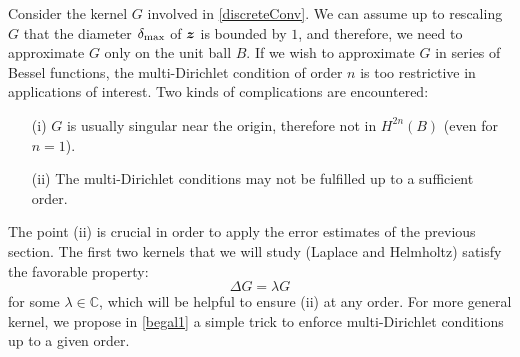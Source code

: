 \documentclass[smallextended]{svjour3}
\begin{document}
Consider the kernel $G$ involved in \eqref{discreteConv}. We can assume up to rescaling $G$ that the diameter $\delta_{\max}$ of $\boldsymbol{z}$ is bounded by $1$, and therefore, we need to approximate $G$ only on the unit ball $B$. 
If we wish to approximate $G$ in series of Bessel functions, the multi-Dirichlet condition of order $n$ is too restrictive in applications of interest. Two kinds of complications are encountered:
\begin{itemize}
	\item[(i)] $G$ is usually singular near the origin, therefore not in $H^{2n}(B)$ (even for $n=1$). 
	\item[(ii)] The multi-Dirichlet conditions may not be fulfilled up to a sufficient order.
\end{itemize}

The point (ii) is crucial in order to apply the error estimates of the previous section. The first two kernels that we will study (Laplace and Helmholtz) satisfy the favorable property:
\[\Delta G = \lambda G\]
for some $\lambda \in \mathbb{C}$, which will be helpful to ensure (ii) at any order. For more general kernel, we propose in \autoref{begal1} a simple trick to enforce multi-Dirichlet conditions up to a given order. 
\end{document}
